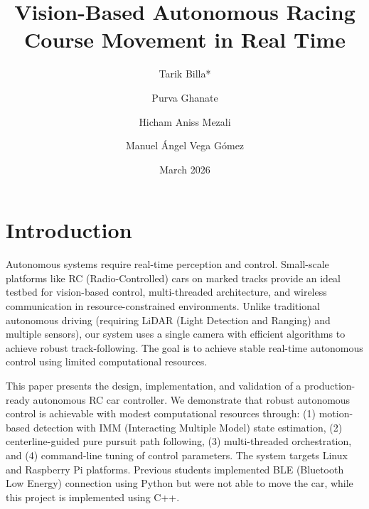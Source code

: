 \documentclass[twocolumn]{article}
\title{Vision-Based Autonomous Racing Course Movement in Real Time}
\author[1]{Tarik Billa*}
\author[1]{Purva Ghanate}
\author[1]{Hicham Aniss Mezali}
\author[1]{Manuel Ángel Vega Gómez}
\affil[1]{Department of Control, Computer and Communications Engineering \\
THM University of Applied Sciences, Friedberg, Germany}
\date{March 2026}
\begin{document}
\section{Introduction}
Autonomous systems require real-time perception and control. Small-scale platforms like RC (Radio-Controlled) cars on marked tracks provide an ideal testbed for vision-based control, multi-threaded architecture, and wireless communication in resource-constrained environments. Unlike traditional autonomous driving (requiring LiDAR (Light Detection and Ranging) and multiple sensors), our system uses a single camera with efficient algorithms to achieve robust track-following. The goal is to achieve stable real-time autonomous control using limited computational resources.

This paper presents the design, implementation, and validation of a production-ready autonomous RC car controller. We demonstrate that robust autonomous control is achievable with modest computational resources through: (1) motion-based detection with IMM (Interacting Multiple Model) state estimation, (2) centerline-guided pure pursuit path following, (3) multi-threaded orchestration, and (4) command-line tuning of control parameters. The system targets Linux and Raspberry Pi platforms. Previous students implemented BLE (Bluetooth Low Energy) connection using Python but were not able to move the car, while this project is implemented using C++.
\end{document}
